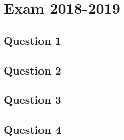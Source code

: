 \section{Exam 2018-2019}

\subsection{Question 1}
\subsection{Question 2}
\subsection{Question 3}
\subsection{Question 4}
